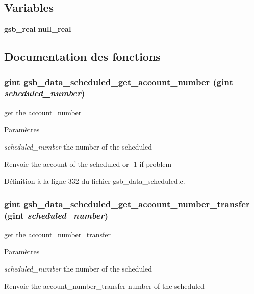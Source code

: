 \subsection*{Variables}
\begin{DoxyCompactItemize}
\item 
{\bf gsb\_\-real} {\bf null\_\-real}
\end{DoxyCompactItemize}


\subsection{Documentation des fonctions}
\subsubsection[{gsb\_\-data\_\-scheduled\_\-get\_\-account\_\-number}]{\setlength{\rightskip}{0pt plus 5cm}gint gsb\_\-data\_\-scheduled\_\-get\_\-account\_\-number (gint {\em scheduled\_\-number})}\label{gsb__data__scheduled_8c_aa15f27d9a7a635618cfc3b536cebb980}
get the account\_\-number


\begin{DoxyParams}{Paramètres}
\item[{\em scheduled\_\-number}]the number of the scheduled\end{DoxyParams}
\begin{DoxyReturn}{Renvoie}
the account of the scheduled or -\/1 if problem 
\end{DoxyReturn}


Définition à la ligne 332 du fichier gsb\_\-data\_\-scheduled.c.

\subsubsection[{gsb\_\-data\_\-scheduled\_\-get\_\-account\_\-number\_\-transfer}]{\setlength{\rightskip}{0pt plus 5cm}gint gsb\_\-data\_\-scheduled\_\-get\_\-account\_\-number\_\-transfer (gint {\em scheduled\_\-number})}\label{gsb__data__scheduled_8c_ab6286df91402f557a522e8d6ff8b57c0}
get the account\_\-number\_\-transfer 
\begin{DoxyParams}{Paramètres}
\item[{\em scheduled\_\-number}]the number of the scheduled\end{DoxyParams}
\begin{DoxyReturn}{Renvoie}
the account\_\-number\_\-transfer number of the scheduled 
\end{DoxyReturn}


